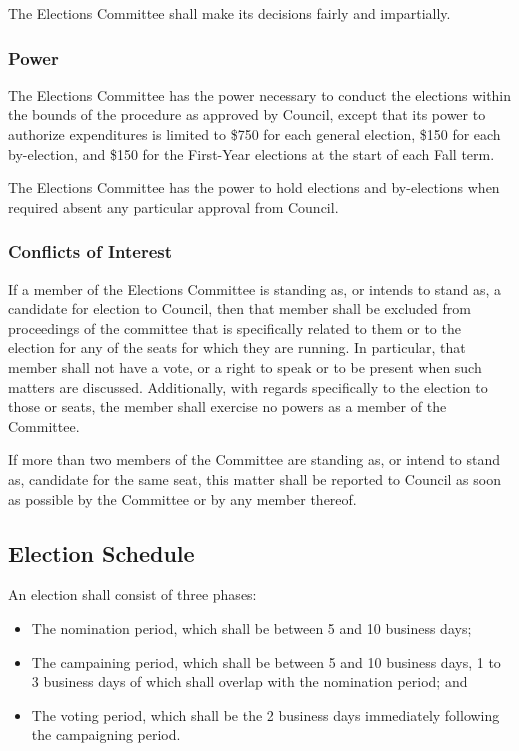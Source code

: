 The Elections Committee shall make its decisions fairly and impartially.

\subsubsection{Power}
The Elections Committee has the power necessary to conduct the elections within
the bounds of the procedure as approved by Council, except that its power to
authorize expenditures is limited to \$750 for each general election, \$150
for each by-election, and \$150 for the First-Year elections at the start of
each Fall term.

The Elections Committee has the power to hold elections and by-elections when
required absent any particular approval from Council.

\subsubsection{Conflicts of Interest}
If a member of the Elections Committee is standing as, or intends to stand as, a
candidate for election to Council, then that member shall be excluded from
proceedings of the committee that is specifically related to them or to the
election for any of the seats for which they are running. In particular, that
member shall not have a vote, or a right to speak or to be present when such
matters are discussed. Additionally, with regards specifically to the election
to those or seats, the member shall exercise no powers as a member of the
Committee.

If more than two members of the Committee are standing as, or intend to stand
as, candidate for the same seat, this matter shall be reported to Council as
soon as possible by the Committee or by any member thereof.

\subsection{Election Schedule}
An election shall consist of three phases:

\begin{itemize}
\item The nomination period, which shall be between 5 and 10 business days;
\item The campaining period, which shall be between 5 and 10 business days, 1 to
3 business days of which shall overlap with the nomination period; and
\item The voting period, which shall be the 2 business days immediately
following the campaigning period.
\end{itemize}

